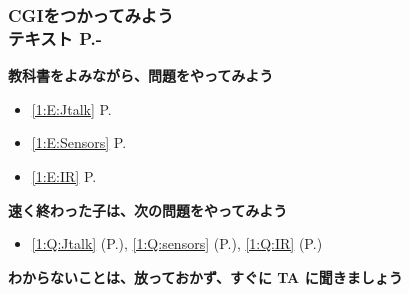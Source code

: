 
\begin{frame}[fragile]
	\frametitle{CGIをつかってみよう\\テキスト P.\pageref{1:P:slide_p28}-~~~}
      \large\textbf{教科書をよみながら、問題をやってみよう}
				\begin{itemize}\small
					\item \ref*{1:E:Jtalk} P.\pageref{1:E:Jtalk}
					\item \ref*{1:E:Sensors} P.\pageref{1:E:Sensors}
					\item \ref*{1:E:IR} P.\pageref{1:E:IR}
				\end{itemize} 
        \vfill
        \large\textbf{速く終わった子は、次の問題をやってみよう}
                \begin{itemize}\small
                    \item \ref*{1:Q:Jtalk} (P.\pageref{1:Q:Jtalk}), \ref*{1:Q:sensors} (P.\pageref{1:Q:sensors}), \ref*{1:Q:IR} (P.\pageref{1:Q:IR})
                \end{itemize}
        \vfill
      \large\textbf{わからないことは、放っておかず、すぐに TA に聞きましょう}
\end{frame}
